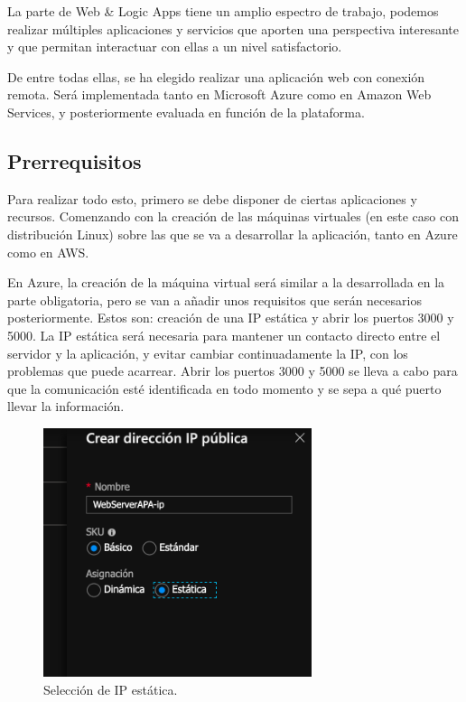 \documentclass[english,runningheads,a4paper]{llncs}[2018/03/10]
\begin{document}
La parte de Web \& Logic Apps tiene un amplio espectro de trabajo, podemos realizar
múltiples aplicaciones y servicios que aporten una perspectiva interesante y que
permitan interactuar con ellas a un nivel satisfactorio.

De entre todas ellas, se ha elegido realizar una aplicación web con conexión remota.
Será implementada tanto en Microsoft Azure como en Amazon Web Services, y
posteriormente evaluada en función de la plataforma.

\subsection{Prerrequisitos}

Para realizar todo esto, primero se debe disponer de ciertas aplicaciones y
recursos. Comenzando con la creación de las máquinas virtuales (en este caso con
distribución Linux) sobre las que se va a desarrollar la aplicación, tanto en Azure
como en AWS.

En Azure, la creación de la máquina virtual será similar a la desarrollada en la
parte obligatoria, pero se van a añadir unos requisitos que serán necesarios
posteriormente. Estos son: creación de una IP estática y abrir los puertos 3000 y
5000. La IP estática será necesaria para mantener un contacto directo entre el
servidor y la aplicación, y evitar cambiar continuadamente la IP, con los problemas
que puede acarrear. Abrir los puertos 3000 y 5000 se lleva a cabo para que la
comunicación esté identificada en todo momento y se sepa a qué puerto llevar la
información.

\begin{figure}[H]
 \centering
 \includegraphics[width=0.7\textwidth]{./Web/Azure/Azure1.png}
 \caption{Selección de IP estática.}
\end{figure}
\end{document}
